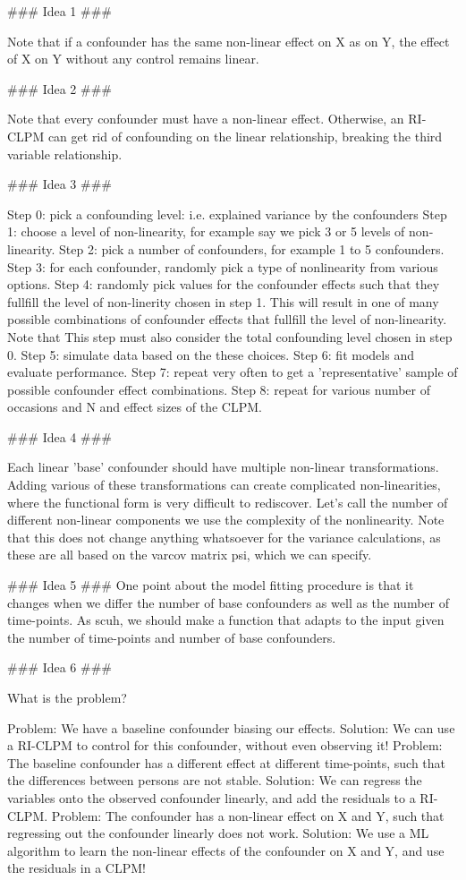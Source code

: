 ### Idea 1 ###

Note that if a confounder has the same non-linear effect on X as on Y, the effect of X on Y without any control remains linear. 

### Idea 2 ###

Note that every confounder must have a non-linear effect. Otherwise, an RI-CLPM can get rid of confounding on the linear relationship,
breaking the third variable relationship. 

### Idea 3 ###

Step 0: pick a confounding level: i.e. explained variance by the confounders 
Step 1: choose a level of non-linearity, for example say we pick 3 or 5 levels of non-linearity. 
Step 2: pick a number of confounders, for example 1 to 5 confounders.
Step 3: for each confounder, randomly pick a type of nonlinearity from various options. 
Step 4: randomly pick values for the confounder effects such that they fullfill the level of non-linerity chosen in step 1. This 
        will result in one of many possible combinations of confounder effects that fullfill the level of non-linearity. Note that
        This step must also consider the total confounding level chosen in step 0.
Step 5: simulate data based on the these choices. 
Step 6: fit models and evaluate performance.
Step 7: repeat very often to get a 'representative' sample of possible confounder effect combinations.
Step 8: repeat for various number of occasions and N and effect sizes of the CLPM. 

### Idea 4 ### 

Each linear 'base' confounder should have multiple non-linear transformations. Adding various of these transformations can create complicated
non-linearities, where the functional form is very difficult to rediscover. Let's call the number of different non-linear components we use
the complexity of the nonlinearity. Note that this does not change anything whatsoever for the variance calculations, as these are all based 
on the varcov matrix psi, which we can specify. 

### Idea 5 ###   
One point about the model fitting procedure is that it changes when we differ the number of base confounders as well as the number of time-points. 
As scuh, we should make a function that adapts to the input given the number of time-points and number of base confounders. 

### Idea 6 ###

What is the problem? 

Problem:  We have a baseline confounder biasing our effects. 
Solution: We can use a RI-CLPM to control for this confounder, without even observing it! 
Problem:  The baseline confounder has a different effect at different time-points, such that the differences between persons are not stable.
Solution: We can regress the variables onto the observed confounder linearly, and add the residuals to a RI-CLPM.
Problem:  The confounder has a non-linear effect on X and Y, such that regressing out the confounder linearly does not work.
Solution: We use a ML algorithm to learn the non-linear effects of the confounder on X and Y, and use the residuals in a CLPM! 

